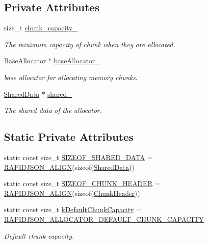 \subsection*{Private Attributes}
\begin{DoxyCompactItemize}
\item 
size\+\_\+t \hyperlink{classMemoryPoolAllocator_a67909468c193d429a227a74d35c4d8cb}{chunk\+\_\+capacity\+\_\+}
\begin{DoxyCompactList}\small\item\em The minimum capacity of chunk when they are allocated. \end{DoxyCompactList}\item 
Base\+Allocator $\ast$ \hyperlink{classMemoryPoolAllocator_a628cd7f46e838fb37ceccf65dd17bce6}{base\+Allocator\+\_\+}
\begin{DoxyCompactList}\small\item\em base allocator for allocating memory chunks. \end{DoxyCompactList}\item 
\hyperlink{structMemoryPoolAllocator_1_1SharedData}{Shared\+Data} $\ast$ \hyperlink{classMemoryPoolAllocator_a17d48b0a767d489eed4241444702368c}{shared\+\_\+}
\begin{DoxyCompactList}\small\item\em The shared data of the allocator. \end{DoxyCompactList}\end{DoxyCompactItemize}
\subsection*{Static Private Attributes}
\begin{DoxyCompactItemize}
\item 
static const size\+\_\+t \hyperlink{classMemoryPoolAllocator_aa2538f9ce977f511009747f60b1ae552}{S\+I\+Z\+E\+O\+F\+\_\+\+S\+H\+A\+R\+E\+D\+\_\+\+D\+A\+TA} = \hyperlink{group__RAPIDJSON__CONFIG_ga583915242504c7fdb36e826f02f76242}{R\+A\+P\+I\+D\+J\+S\+O\+N\+\_\+\+A\+L\+I\+GN}(sizeof(\hyperlink{structMemoryPoolAllocator_1_1SharedData}{Shared\+Data}))
\item 
static const size\+\_\+t \hyperlink{classMemoryPoolAllocator_a195c16fcdba57918869168c48d97737f}{S\+I\+Z\+E\+O\+F\+\_\+\+C\+H\+U\+N\+K\+\_\+\+H\+E\+A\+D\+ER} = \hyperlink{group__RAPIDJSON__CONFIG_ga583915242504c7fdb36e826f02f76242}{R\+A\+P\+I\+D\+J\+S\+O\+N\+\_\+\+A\+L\+I\+GN}(sizeof(\hyperlink{structMemoryPoolAllocator_1_1ChunkHeader}{Chunk\+Header}))
\item 
static const size\+\_\+t \hyperlink{classMemoryPoolAllocator_a8d9337bc406a25dd06a24ee3fa5fb58c}{k\+Default\+Chunk\+Capacity} = \hyperlink{group__RAPIDJSON__CONFIG_ga860570d04d489be08b9835d2ec58bac5}{R\+A\+P\+I\+D\+J\+S\+O\+N\+\_\+\+A\+L\+L\+O\+C\+A\+T\+O\+R\+\_\+\+D\+E\+F\+A\+U\+L\+T\+\_\+\+C\+H\+U\+N\+K\+\_\+\+C\+A\+P\+A\+C\+I\+TY}
\begin{DoxyCompactList}\small\item\em Default chunk capacity. \end{DoxyCompactList}\end{DoxyCompactItemize}


